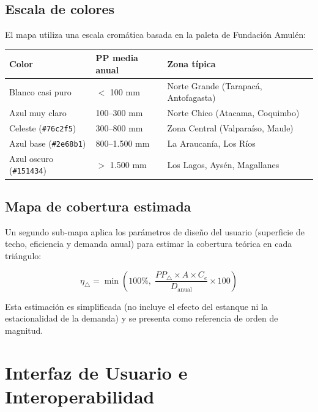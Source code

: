 \documentclass[12pt, a4paper]{article}
\begin{document}
\subsection{Escala de colores}

El mapa utiliza una escala cromática basada en la paleta de Fundación Amulén:

\begin{center}
\begin{tabular}{llll}
\toprule
\textbf{Color} & \textbf{PP media anual} & \textbf{Zona típica} \\
\midrule
Blanco casi puro & $<$ 100 mm & Norte Grande (Tarapacá, Antofagasta) \\
Azul muy claro & 100--300 mm & Norte Chico (Atacama, Coquimbo) \\
Celeste (\texttt{\#76c2f5}) & 300--800 mm & Zona Central (Valparaíso, Maule) \\
Azul base (\texttt{\#2e68b1}) & 800--1.500 mm & La Araucanía, Los Ríos \\
Azul oscuro (\texttt{\#151434}) & $>$ 1.500 mm & Los Lagos, Aysén, Magallanes \\
\bottomrule
\end{tabular}
\end{center}

\subsection{Mapa de cobertura estimada}

Un segundo sub-mapa aplica los parámetros de diseño del usuario (superficie de techo, eficiencia y demanda anual) para estimar la cobertura teórica en cada triángulo:

\begin{equation}
    \eta_{\triangle} = \min\!\left(100\%,\; \frac{PP_{\triangle} \times A \times C_e}{D_{\text{anual}}} \times 100\right)
\end{equation}

Esta estimación es simplificada (no incluye el efecto del estanque ni la estacionalidad de la demanda) y se presenta como referencia de orden de magnitud.

\section{Interfaz de Usuario e Interoperabilidad}
\end{document}
